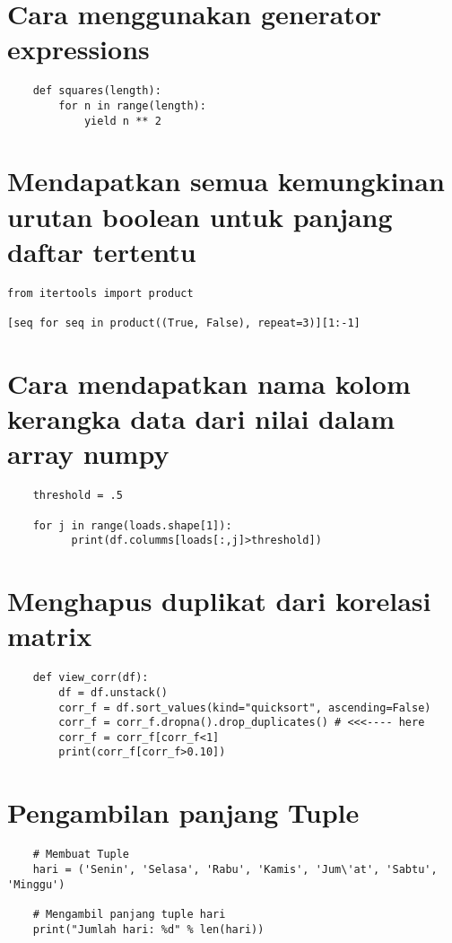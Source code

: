 \documentclass[12pt]{article} %
\begin{document}
\section{Cara menggunakan generator expressions}
\begin{lstlisting}
	def squares(length):
	    for n in range(length):
	        yield n ** 2
\end{lstlisting}

\section{Mendapatkan semua kemungkinan urutan boolean untuk panjang daftar tertentu}
\begin{lstlisting}
from itertools import product

[seq for seq in product((True, False), repeat=3)][1:-1]
\end{lstlisting}

\section{Cara mendapatkan nama kolom kerangka data dari nilai dalam array numpy}
\begin{lstlisting}
	threshold = .5
	
	for j in range(loads.shape[1]):
	      print(df.columms[loads[:,j]>threshold])
\end{lstlisting}

\section{Menghapus duplikat dari korelasi matrix}
\begin{lstlisting}
	def view_corr(df):
	    df = df.unstack()
	    corr_f = df.sort_values(kind="quicksort", ascending=False)
	    corr_f = corr_f.dropna().drop_duplicates() # <<<---- here
	    corr_f = corr_f[corr_f<1]
	    print(corr_f[corr_f>0.10])
\end{lstlisting}

\section{Pengambilan panjang Tuple}
\begin{lstlisting}
	# Membuat Tuple
	hari = ('Senin', 'Selasa', 'Rabu', 'Kamis', 'Jum\'at', 'Sabtu', 'Minggu')
	
	# Mengambil panjang tuple hari
	print("Jumlah hari: %d" % len(hari))
\end{lstlisting}
\end{document}
